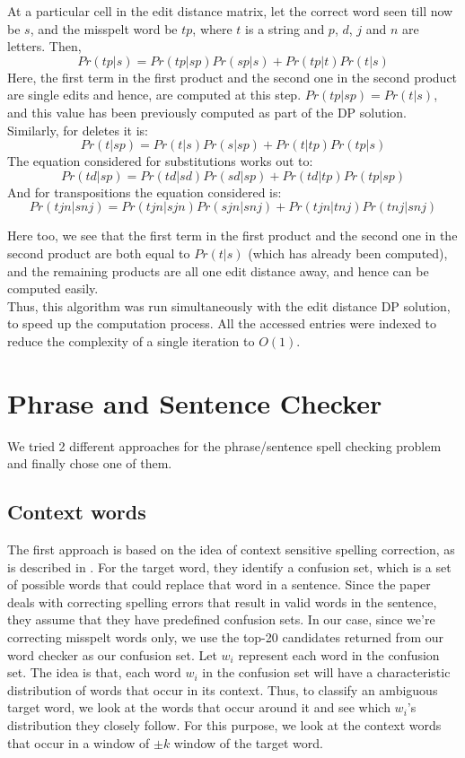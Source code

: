 At a particular cell in the edit distance matrix, let the correct word seen till now be $s$, and the misspelt word be $tp$, where $t$ is a string and $p$, $d$, $j$ and $n$ are letters. Then,
\[Pr(tp|s) = Pr(tp|sp)Pr(sp|s) + Pr(tp|t)Pr(t|s)\]
Here, the first term in the first product and the second one in the second product are single edits and hence, are computed at this step. $Pr(tp|sp) = Pr(t|s)$, and this value has been previously computed as part of the DP solution. Similarly, for deletes it is:
\[Pr(t|sp) = Pr(t|s)Pr(s|sp)+Pr(t|tp)Pr(tp|s)\]
The equation considered for substitutions works out to:
\[Pr(td|sp) = Pr(td|sd)Pr(sd|sp)+Pr(td|tp)Pr(tp|sp)\]
And for transpositions the equation considered is:
\[Pr(tjn|snj) = Pr(tjn|sjn)Pr(sjn|snj)+Pr(tjn|tnj)Pr(tnj|snj)\]

Here too, we see that the first term in the first product and the second one in the second product are both equal to $Pr(t|s)$ (which has already been computed), and the remaining products are all one edit distance away, and hence can be computed easily.\\

Thus, this algorithm was run simultaneously with the edit distance DP solution, to speed up the computation process. All the accessed entries were indexed to reduce the complexity of a single iteration to $O(1)$.

\section{Phrase and Sentence Checker}
We tried 2 different approaches for the phrase/sentence spell checking problem and finally chose one of them.
\subsection{Context words}
The first approach is based on the idea of context sensitive spelling correction, as is described in \cite{golding}. For the target word, they identify a confusion set, which is a set of possible words that could replace that word in a sentence. Since the paper deals with correcting spelling errors that result in valid words in the sentence, they assume that they have predefined confusion sets. In our case, since we're correcting misspelt words only, we use the top-20 candidates returned from our word checker as our confusion set. Let $w_i$ represent each word in the confusion set. The idea is that, each word $w_i$ in the confusion set will have a
characteristic distribution of words that occur in its context. Thus, to classify an ambiguous target word, we look at the words that occur around it and see which $w_i$'s distribution they closely follow. For this purpose, we look at the context words that occur in a window of $\pm k$ window of the target word. 

